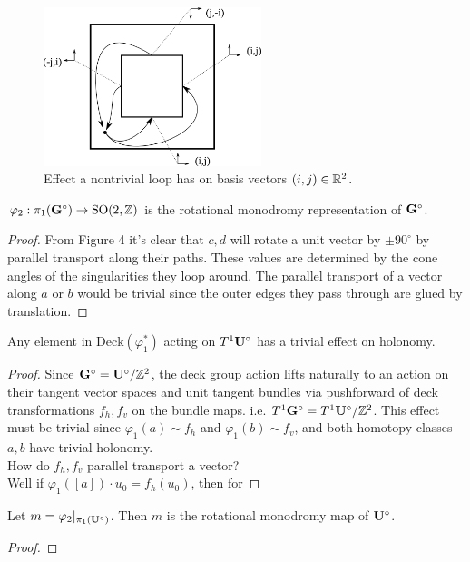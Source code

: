 \documentclass[]{article}
\begin{document}
\begin{figure}[H]
\centering
\includegraphics[width=2.5in]{monodromy.png}
\caption{Effect a nontrivial loop has on basis vectors $(i,j)\in\mathbb{R}^2$.}
\label{fig:loop}
\end{figure}

\begin{lem}
$\varphi_2:\pi_1(\mathbf{G}^\circ)\rightarrow \mathrm{SO}(2,\mathbb{Z})$ is the rotational monodromy representation of $\mathbf{G}^\circ$.
\begin{proof}
From Figure 4 it's clear that $c,d$ will rotate a unit vector by $\pm 90^\circ$ by parallel transport along their paths. These values are determined by the cone angles of the singularities they loop around. The parallel transport of a vector along $a$ or $b$ would be trivial since the outer edges they pass through are glued by translation.
\end{proof}
\end{lem}


\begin{lem}
Any element in $\text{Deck}(\varphi_1^*)$ acting on $T^1\mathbf{U}^\circ$ has a trivial effect on holonomy.
\begin{proof}
Since $\mathbf{G}^\circ=\mathbf{U}^\circ/\mathbb{Z}^2$, the deck group action lifts naturally to an action on their tangent vector spaces and unit tangent bundles via pushforward of deck transformations $f_h,f_v$ on the bundle maps. i.e. $T^1\mathbf{G}^\circ=T^1\mathbf{U}^\circ/\mathbb{Z}^2$. This effect must be trivial since $\varphi_1(a)\sim f_h$ and $\varphi_1(b)\sim f_v$, and both homotopy classes $a,b$ have trivial holonomy.  \\
How do $f_h,f_v$ parallel transport a vector?\\
Well if $\varphi_1([a])\cdot u_0=f_h(u_0)$, then for 
\end{proof}
\end{lem}



\begin{thm}
Let $m=\varphi_2\vert_{\pi_1(\mathbf{U}^\circ)}$. Then $m$ is the rotational monodromy map of $\mathbf{U}^\circ$.
\begin{proof}

\end{proof}
\end{thm}
\end{document}
